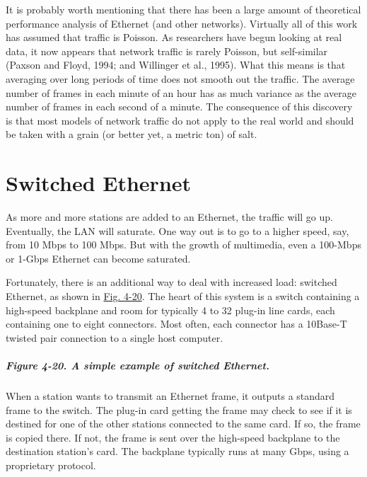 It is probably worth mentioning that there has been a large amount of
theoretical performance analysis of Ethernet (and other networks).
Virtually all of this work has assumed that traffic is Poisson. As
researchers have begun looking at real data, it now appears that network
traffic is rarely Poisson, but self-similar (Paxson and Floyd, 1994; and
Willinger et al., 1995). What this means is that averaging over long
periods of time does not smooth out the traffic. The average number of
frames in each minute of an hour has as much variance as the average
number of frames in each second of a minute. The consequence of this
discovery is that most models of network traffic do not apply to the
real world and should be taken with a grain (or better yet, a metric
ton) of salt.

\protect\hypertarget{0130661023_ch04lev1sec3.htmlux5cux23ch04lev2sec14}{}{}

\section{Switched Ethernet}

As more and more stations are added to an Ethernet, the traffic will go
up. Eventually, the LAN will saturate. One way out is to go to a higher
speed, say, from 10 Mbps to 100 Mbps. But with the growth of multimedia,
even a 100-Mbps or 1-Gbps Ethernet can become saturated.

Fortunately, there is an additional way to deal with increased load:
switched Ethernet, as shown in
\protect\hyperlink{0130661023_ch04lev1sec3.htmlux5cux23ch04fig20}{Fig.
4-20}. The heart of this system is a {switch} containing a high-speed
backplane and room for typically 4 to 32 plug-in line cards, each
containing one to eight connectors. Most often, each connector has a
10Base-T twisted pair connection to a single host computer.

\subparagraph[Figure 4-20. A simple example of switched
Ethernet.]{\texorpdfstring{\protect\hypertarget{0130661023_ch04lev1sec3.htmlux5cux23ch04fig20}{}{}Figure
4-20. A simple example of switched
Ethernet.}{Figure 4-20. A simple example of switched Ethernet.}}


When a station wants to transmit an Ethernet frame, it outputs a
standard frame to the switch. The plug-in card getting the frame may
check to see if it is destined for one of the other stations connected
to the same card. If so, the frame is copied there. If not, the frame is
sent over the high-speed backplane to the destination station's card.
The backplane typically runs at many Gbps, using a proprietary protocol.


